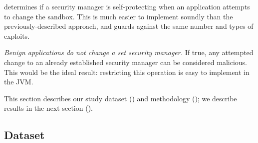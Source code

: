 \documentclass{sig-alternate}
\begin{document}
\begin{flushenum}
  determines if a security manager is self-protecting when an application
  attempts to change the sandbox. This is much easier to implement soundly than
  the previously-described approach, and guards against the same number and types of
  exploits.
\item \textit{Benign applications do not change a set security manager.} If
  true, any attempted change to an already established security manager can be
  considered malicious. This would be the ideal result: restricting this
  operation is easy to implement in the JVM.
\end{flushenum}

This section describes our study dataset () and
methodology (); we describe results in the next section
(). 

\subsection{Dataset}\label{sec:Applications-Studied}
\end{document}
